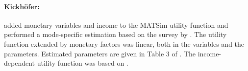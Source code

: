 \paragraph{Kickhöfer:}
\citet[][]{Kickhoefer_MastersThesis_2009} added monetary variables and income to the MATSim utility function and performed a mode-specific estimation based on the survey by \citet[][]{VrticEtAl_ResRep_SVI_2007}. The utility function extended by monetary factors was linear, both in the variables and the parameters. Estimated parameters are given in Table 3 of \citet[][]{Kickhoefer_MastersThesis_2009}. The income-dependent utility function was based on \citet[][]{Franklin_PhDThesis_2006}.




